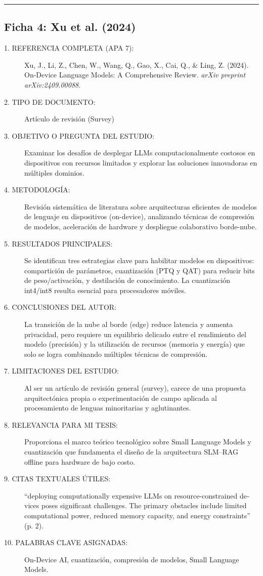 \vspace{0.5cm}
\hrule
\vspace{0.5cm}

\subsection*{Ficha 4: Xu et al. (2024)}
\begin{description}
	\item[1. REFERENCIA COMPLETA (APA 7):] Xu, J., Li, Z., Chen, W., Wang, Q., Gao, X., Cai, Q., \& Ling, Z. (2024). On-Device Language Models: A Comprehensive Review. \textit{arXiv preprint arXiv:2409.00088}.
	\item[2. TIPO DE DOCUMENTO:] Artículo de revisión (Survey)
	\item[3. OBJETIVO O PREGUNTA DEL ESTUDIO:] Examinar los desafíos de desplegar LLMs computacionalmente costosos en dispositivos con recursos limitados y explorar las soluciones innovadoras en múltiples dominios.
	\item[4. METODOLOGÍA:] Revisión sistemática de literatura sobre arquitecturas eficientes de modelos de lenguaje en dispositivos (on-device), analizando técnicas de compresión de modelos, aceleración de hardware y despliegue colaborativo borde-nube.
	\item[5. RESULTADOS PRINCIPALES:] Se identifican tres estrategias clave para habilitar modelos en dispositivos: compartición de parámetros, cuantización (PTQ y QAT) para reducir bits de peso/activación, y destilación de conocimiento. La cuantización int4/int8 resulta esencial para procesadores móviles.
	\item[6. CONCLUSIONES DEL AUTOR:] La transición de la nube al borde (edge) reduce latencia y aumenta privacidad, pero requiere un equilibrio delicado entre el rendimiento del modelo (precisión) y la utilización de recursos (memoria y energía) que solo se logra combinando múltiples técnicas de compresión.
	\item[7. LIMITACIONES DEL ESTUDIO:] Al ser un artículo de revisión general (survey), carece de una propuesta arquitectónica propia o experimentación de campo aplicada al procesamiento de lenguas minoritarias y aglutinantes.
	\item[8. RELEVANCIA PARA MI TESIS:] Proporciona el marco teórico tecnológico sobre Small Language Models y cuantización que fundamenta el diseño de la arquitectura SLM--RAG offline para hardware de bajo costo.
	\item[9. CITAS TEXTUALES ÚTILES:] \foreignlanguage{english}{``deploying computationally expensive LLMs on resource-constrained devices poses significant challenges. The primary obstacles include limited computational power, reduced memory capacity, and energy constraints''} (p. 2).
	\item[10. PALABRAS CLAVE ASIGNADAS:] \foreignlanguage{english}{On-Device} AI, cuantización, compresión de modelos, Small Language Models.
\end{description}

